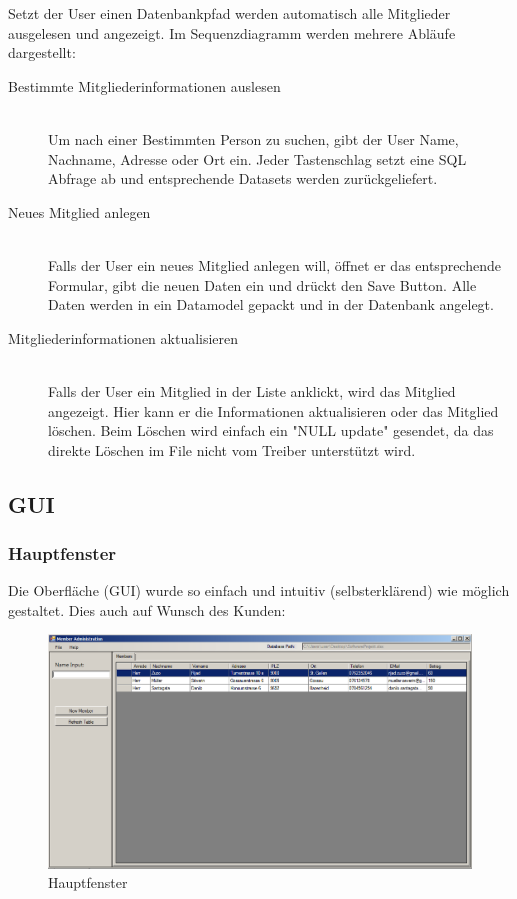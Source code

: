 \documentclass{article}
\begin{document}
Setzt der User einen Datenbankpfad werden automatisch alle Mitglieder ausgelesen und angezeigt.
Im Sequenzdiagramm werden mehrere Abläufe dargestellt: 
\begin{description}
	\item[Bestimmte Mitgliederinformationen auslesen] \hfill \\ 
		Um nach einer Bestimmten Person zu suchen, gibt der User Name, Nachname, Adresse oder Ort ein. Jeder Tastenschlag setzt eine SQL Abfrage ab und entsprechende Datasets werden zurückgeliefert.
	
	\item[Neues Mitglied anlegen] \hfill \\  
		Falls der User ein neues Mitglied anlegen will, öffnet er das entsprechende Formular, gibt die neuen Daten ein und drückt den Save Button. Alle Daten werden in ein Datamodel gepackt und in der Datenbank angelegt.

	\item[Mitgliederinformationen aktualisieren] \hfill \\ 
		 Falls der User ein Mitglied in der Liste anklickt, wird das Mitglied angezeigt. Hier kann er die Informationen aktualisieren oder das Mitglied löschen. Beim Löschen wird einfach ein "NULL update" gesendet, da das direkte Löschen im File nicht vom Treiber unterstützt wird.
\end{description}

\newpage


\subsection{GUI}
\subsubsection{Hauptfenster}
Die Oberfläche (GUI) wurde so einfach und intuitiv (selbsterklärend) wie möglich gestaltet. Dies auch auf Wunsch des Kunden:
\begin{figure}[h]
	\centering
	\includegraphics[width=1.0 \textwidth]{MainGUI}
	\caption{Hauptfenster}
\end{figure}
\end{document}

